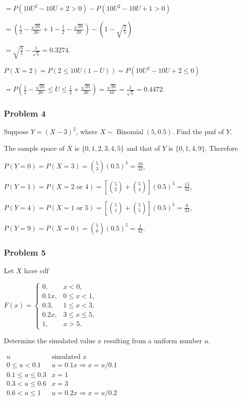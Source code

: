 $=P(10U^2-10U+2>0)-P(10U^2-10U+1>0)$

$=\left(\frac12-\frac{\sqrt{20}}{20}+1-\frac12-\frac{\sqrt{20}}{20}\right)-\left(1-\sqrt{\frac35}\right)$

$=\sqrt{\frac35}-\frac1{\sqrt5}=0.3274$.

$P(X=2)=P(2\leq10U(1-U))=P(10U^2-10U+2\leq0)$

$=P\left(\frac12-\frac{\sqrt{20}}{20}\leq U\leq\frac12+\frac{\sqrt{20}}{20}\right)=\frac{\sqrt{20}}{10}=\frac1{\sqrt5}=0.4472$.

\subsubsection*{Problem 4}

 Suppose $Y=(X-3)^2$, where $X\sim\operatorname{Binomial}(5,0.5)$. Find the pmf of $Y$.

 The sample space of $X$ is $\{0,1,2,3,4,5\}$ and that of $Y$ is $\{0,1,4,9\}$. Therefore

$P(Y=0)=P(X=3)=\binom53(0.5)^5=\frac{10}{32}$,

$P(Y=1)=P(X=2\text{ or }4)=\left[\binom52+\binom54\right](0.5)^5=\frac{15}{32}$,

$P(Y=4)=P(X=1\text{ or }5)=\left[\binom51+\binom55\right](0.5)^5=\frac6{32}$,

$P(Y=9)=P(X=0)=\binom50(0.5)^5=\frac1{32}$.

\subsubsection*{Problem 5}

 Let $X$ have cdf

$F(x)=\begin{cases}0,&x<0,\\0.1x,&0\leq x<1,\\0.3,&1\leq x<3,\\0.2x,&3\leq x\leq5,\\1,&x>5.\end{cases}$

Determine the simulated value $x$ resulting from a uniform number $u$.


$\begin{array}{c|c}u&\text{simulated }x\\\hline0\leq u<0.1&u=0.1x\Rightarrow x=u/0.1\\0.1\leq u\leq0.3&x=1\\0.3<u\leq0.6&x=3\\0.6<u\leq1&u=0.2x\Rightarrow x=u/0.2\end{array}$

